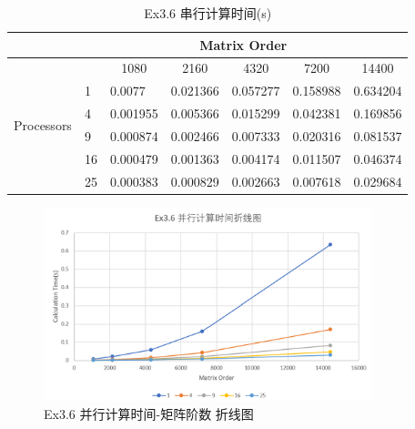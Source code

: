 \documentclass[UTF8]{article}
\begin{document}
    \begin{table}[h]
        \caption{Ex3.6 串行计算时间(s)}
        \label{tab:my-table}
        \centering
        \scalebox{0.8} {
        \begin{tabular}{|c|l|l|l|l|l|l|}
        \hline
        \multicolumn{1}{|l|}{}      & \multicolumn{6}{c|}{Matrix Order}                                                                                                               \\ \hline
        \multirow{6}{*}{Processors} &    & \multicolumn{1}{c|}{1080} & \multicolumn{1}{c|}{2160} & \multicolumn{1}{c|}{4320} & \multicolumn{1}{c|}{7200} & \multicolumn{1}{c|}{14400} \\ \cline{2-7} 
                                    & 1  & 0.0077                    & 0.021366                  & 0.057277                  & 0.158988                  & 0.634204                   \\ \cline{2-7} 
                                    & 4  & 0.001955                  & 0.005366                  & 0.015299                  & 0.042381                  & 0.169856                   \\ \cline{2-7} 
                                    & 9  & 0.000874                  & 0.002466                  & 0.007333                  & 0.020316                  & 0.081537                   \\ \cline{2-7} 
                                    & 16 & 0.000479                  & 0.001363                  & 0.004174                  & 0.011507                  & 0.046374                   \\ \cline{2-7} 
                                    & 25 & 0.000383                  & 0.000829                  & 0.002663                  & 0.007618                  & 0.029684                   \\ \hline
        \end{tabular}}
        \end{table}

        \begin{figure}[h]
            \centering
            \includegraphics[width=0.85\textwidth]{36pco.png}
            \caption{Ex3.6 并行计算时间-矩阵阶数 折线图}
        \end{figure}
    
\end{document}
